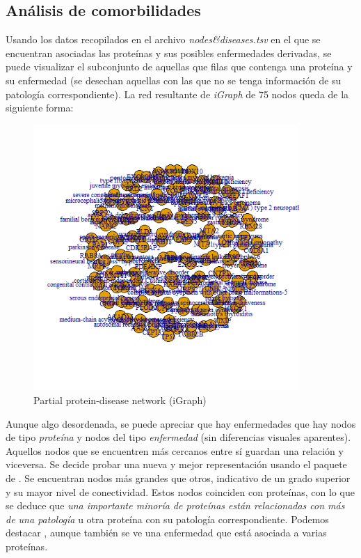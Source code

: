 \subsection{Análisis de comorbilidades}

Usando los datos recopilados en el archivo \textit{nodes&diseases.tsv} en el que se encuentran asociadas las proteínas y sus posibles enfermedades derivadas, se puede visualizar el subconjunto de aquellas que filas que contenga una proteína y su enfermedad (se desechan aquellas con las que no se tenga información de su patología correspondiente). La red resultante de \textit{iGraph} de 75 nodos queda de la siguiente forma:

	\begin{figure}[h!]
		\includegraphics[width=0.9\textwidth]{figures/figuraiGraph.png}
		\caption{Partial protein-disease network (iGraph)}
		\label{fig:ppi_sigraph}
	\end{figure}
	
Aunque algo desordenada, se puede apreciar que hay enfermedades que hay nodos de tipo \textit{proteína} y nodos del tipo \textit{enfermedad} (sin diferencias visuales aparentes). Aquellos nodos que se encuentren más cercanos entre sí guardan una relación y viceversa. Se decide probar una nueva y mejor representación usando el paquete  de . Se encuentran nodos más grandes que otros, indicativo de un grado superior y su mayor nivel de conectividad. Estos nodos coinciden con proteínas, con lo que se deduce que \emph{una importante minoría de proteínas están relacionadas con más de una patología} u otra proteína con su patología correspondiente. Podemos destacar , aunque también se ve una enfermedad que está asociada a varias proteínas.

